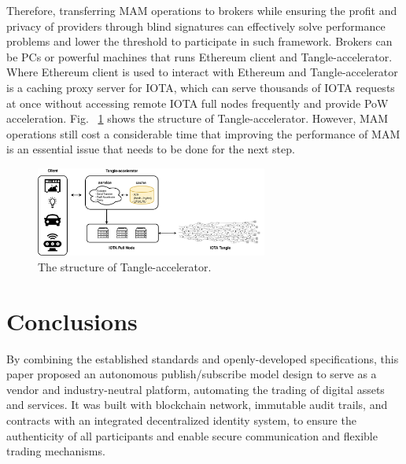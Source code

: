 \documentclass[conference]{IEEEtran}
\begin{document}
Therefore, transferring MAM operations to brokers while ensuring the profit and privacy of providers through blind signatures can effectively solve performance problems and lower the threshold to participate in such framework. Brokers can be PCs or powerful machines that runs Ethereum client and Tangle-accelerator\cite{TA}. Where Ethereum client is used to interact with Ethereum and Tangle-accelerator is a caching proxy server for IOTA, which can serve thousands of IOTA requests at once without accessing remote IOTA full nodes frequently and provide PoW acceleration. Fig.~ \ref{fig:ta_struct} shows the structure of Tangle-accelerator. However, MAM operations still cost a considerable time that improving the performance of MAM is an essential issue that needs to be done for the next step.  

\begin{figure}[!t]
    \centering
    \includegraphics[width=3in]{ta_structure}
    \caption{The structure of Tangle-accelerator.}
    \label{fig:ta_struct}
\end{figure}

\section{Conclusions}
By combining the established standards and openly-developed specifications, this paper proposed an autonomous publish/subscribe model design to serve as a vendor and industry-neutral platform, automating the trading of digital assets and services. It was built with blockchain network, immutable audit trails, and contracts with an integrated decentralized identity system, to ensure the authenticity of all participants and enable secure communication and flexible trading mechanisms.



\end{document}
